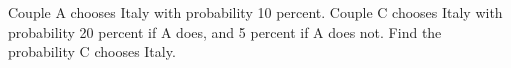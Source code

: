 Couple A chooses Italy with probability 10 percent. Couple C chooses Italy with probability 20 percent if A does, and 5 percent if A does not. Find the probability C chooses Italy.

